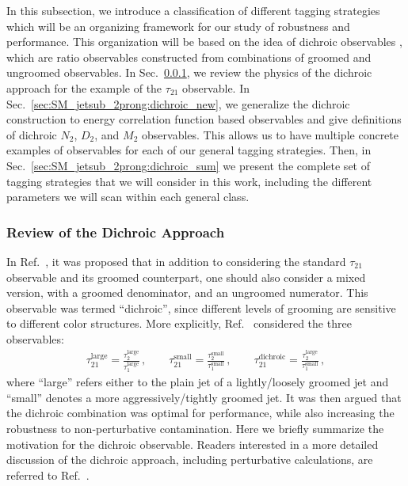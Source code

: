 In this subsection, we introduce a classification of different tagging strategies which will be an organizing framework for our study of robustness and performance.
%
This organization will be based on the idea of dichroic observables \cite{Salam:2016yht}, which are ratio observables constructed from combinations of groomed and ungroomed observables.
%
In Sec.~\ref{sec:SM_jetsub_2prong:dichroic}, we review the physics of the dichroic approach for the example of the $\tau_{21}$ observable.
%
In Sec.~\ref{sec:SM_jetsub_2prong:dichroic_new}, we generalize the dichroic construction to energy correlation function based observables and give definitions of dichroic $N_2$, $D_2$, and $M_2$ observables.
%
This allows us to have multiple concrete examples of observables for each of our general tagging strategies.
%
Then, in Sec.~\ref{sec:SM_jetsub_2prong:dichroic_sum} we present the complete set of tagging strategies that we will consider in this work, including the different parameters we will scan within each general class.



\subsubsection{Review of the Dichroic Approach}\label{sec:SM_jetsub_2prong:dichroic}


In Ref.~\cite{Salam:2016yht}, it was proposed that in addition to considering the standard $\tau_{21}$ observable and its groomed counterpart, one should also consider a mixed version, with a groomed denominator, and an ungroomed numerator.
%
This observable was termed ``dichroic'', since different levels of grooming are sensitive to different color structures.
%
More explicitly, Ref.~\cite{Salam:2016yht} considered the three observables:
%
\begin{align}
  \tau_{21}^{\text{large}} =\frac{\tau_2^{\text{large}}}{\tau_1^{\text{large}}}\,,
  \qquad
  \tau_{21}^{\text{small}} =\frac{\tau_2^{\text{small}}}{\tau_1^{\text{small}}}\,,
  \qquad
  \tau_{21}^{\text{dichroic}} =\frac{\tau_2^{\text{large}}}{\tau_1^{\text{small}}}\,,
\end{align}
where ``large'' refers either to the plain jet of a
lightly/loosely groomed jet and ``small'' denotes a more aggressively/tightly
groomed jet.
%
It was then argued that the dichroic combination was optimal for
performance, while also increasing the robustness to non-perturbative
contamination.
%
Here we briefly summarize the motivation for the dichroic observable.
%
Readers interested in a more detailed discussion of the dichroic approach, including perturbative calculations, are referred to Ref.~\cite{Salam:2016yht}.

